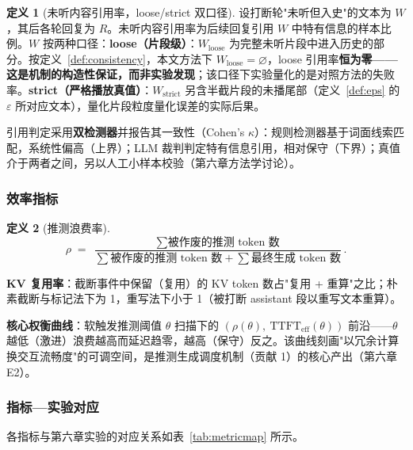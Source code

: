 \documentclass[conference]{IEEEtran}
\theoremstyle{definition}
\newtheorem{definition}{定义}
\begin{document}
\begin{definition}[未听内容引用率，loose/strict 双口径]\label{def:rate}
设打断轮"未听但入史"的文本为 $W$，其后各轮回复为 $R$。未听内容引用率为后续回复引用 $W$ 中特有信息的样本比例。$W$ 按两种口径：\textbf{loose（片段级）}：$W_{\text{loose}}$ 为完整未听片段中进入历史的部分。按定义~\ref{def:consistency}，本文方法下 $W_{\text{loose}} = \varnothing$，loose 引用率\textbf{恒为零——这是机制的构造性保证，而非实验发现}；该口径下实验量化的是对照方法的失败率。\textbf{strict（严格播放真值）}：$W_{\text{strict}}$ 另含半截片段的未播尾部（定义~\ref{def:eps} 的 $\varepsilon$ 所对应文本），量化片段粒度量化误差的实际后果。
\end{definition}

引用判定采用\textbf{双检测器}并报告其一致性（Cohen's $\kappa$）：规则检测器基于词面线索匹配，系统性偏高（上界）；LLM 裁判判定特有信息引用，相对保守（下界）；真值介于两者之间，另以人工小样本校验（第六章方法学讨论）。

\subsubsection{效率指标}

\begin{definition}[推测浪费率]\label{def:rho}
\begin{equation}
\rho \;=\; \frac{\sum \text{被作废的推测 token 数}}{\sum \text{被作废的推测 token 数} + \sum \text{最终生成 token 数}}. \label{eq:rho}
\end{equation}
\end{definition}

\textbf{KV 复用率}：截断事件中保留（复用）的 KV token 数占"复用 + 重算"之比；朴素截断与标记法下为 1，重写法下小于 1（被打断 assistant 段以重写文本重算）。

\textbf{核心权衡曲线}：软触发推测阈值 $\theta$ 扫描下的 $(\rho(\theta),\ \mathrm{TTFT}_{\text{eff}}(\theta))$ 前沿——$\theta$ 越低（激进）浪费越高而延迟趋零，越高（保守）反之。该曲线刻画"以冗余计算换交互流畅度"的可调空间，是推测生成调度机制（贡献 1）的核心产出（第六章 E2）。

\subsubsection{指标—实验对应}
各指标与第六章实验的对应关系如表~\ref{tab:metricmap} 所示。
\end{document}
